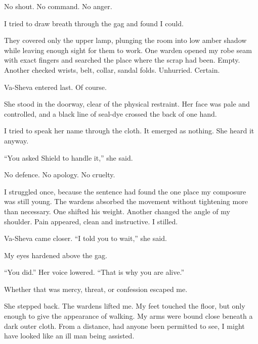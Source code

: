 No shout. No command. No anger.\par

I tried to draw breath through the gag and found I could.\par

They covered only the upper lamp, plunging the room into low amber shadow while leaving enough sight for them to work. One warden opened my robe seam with exact fingers and searched the place where the scrap had been. Empty. Another checked wrists, belt, collar, sandal folds. Unhurried. Certain.\par

Va-Sheva entered last. Of course.\par

She stood in the doorway, clear of the physical restraint. Her face was pale and controlled, and a black line of seal-dye crossed the back of one hand.\par

I tried to speak her name through the cloth. It emerged as nothing. She heard it anyway.\par

``You asked Shield to handle it,'' she said.\par

No defence. No apology. No cruelty.\par

I struggled once, because the sentence had found the one place my composure was still young. The wardens absorbed the movement without tightening more than necessary. One shifted his weight. Another changed the angle of my shoulder. Pain appeared, clean and instructive. I stilled.\par

Va-Sheva came closer. ``I told you to wait,'' she said.\par

My eyes hardened above the gag.\par

``You did.'' Her voice lowered. ``That is why you are alive.''\par

Whether that was mercy, threat, or confession escaped me.\par

She stepped back. The wardens lifted me. My feet touched the floor, but only enough to give the appearance of walking. My arms were bound close beneath a dark outer cloth. From a distance, had anyone been permitted to see, I might have looked like an ill man being assisted.\par


